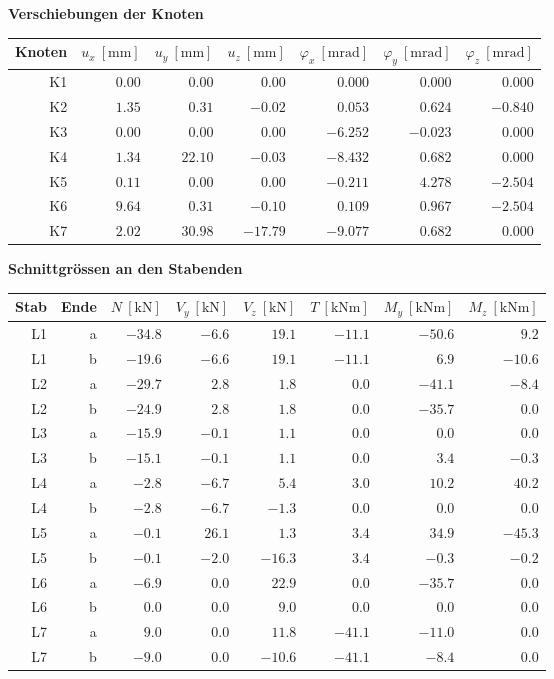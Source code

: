 \documentclass[11pt,a4paper]{article}
\begin{document}
\noindent\textbf{Verschiebungen der Knoten}
\begin{longtable}{rrrrrrr}
\hline
Knoten & $u_x\ [\mathrm{mm}]$ & $u_y\ [\mathrm{mm}]$ & $u_z\ [\mathrm{mm}]$ & $\varphi_x\ [\mathrm{mrad}]$ & $\varphi_y\ [\mathrm{mrad}]$ & $\varphi_z\ [\mathrm{mrad}]$ \\
\hline
\endhead
K1 & $0.00$ & $0.00$ & $0.00$ & $0.000$ & $0.000$ & $0.000$ \\
K2 & $1.35$ & $0.31$ & $-0.02$ & $0.053$ & $0.624$ & $-0.840$ \\
K3 & $0.00$ & $0.00$ & $0.00$ & $-6.252$ & $-0.023$ & $0.000$ \\
K4 & $1.34$ & $22.10$ & $-0.03$ & $-8.432$ & $0.682$ & $0.000$ \\
K5 & $0.11$ & $0.00$ & $0.00$ & $-0.211$ & $4.278$ & $-2.504$ \\
K6 & $9.64$ & $0.31$ & $-0.10$ & $0.109$ & $0.967$ & $-2.504$ \\
K7 & $2.02$ & $30.98$ & $-17.79$ & $-9.077$ & $0.682$ & $0.000$ \\
\hline
\end{longtable}
\noindent\textbf{Schnittgrössen an den Stabenden}
\begin{longtable}{rrrrrrrr}
\hline
Stab & Ende & $N\ [\mathrm{kN}]$ & $V_y\ [\mathrm{kN}]$ & $V_z\ [\mathrm{kN}]$ & $T\ [\mathrm{kNm}]$ & $M_y\ [\mathrm{kNm}]$ & $M_z\ [\mathrm{kNm}]$ \\
\hline
\endhead
L1 & a & $-34.8$ & $-6.6$ & $19.1$ & $-11.1$ & $-50.6$ & $9.2$ \\
L1 & b & $-19.6$ & $-6.6$ & $19.1$ & $-11.1$ & $6.9$ & $-10.6$ \\
L2 & a & $-29.7$ & $2.8$ & $1.8$ & $0.0$ & $-41.1$ & $-8.4$ \\
L2 & b & $-24.9$ & $2.8$ & $1.8$ & $0.0$ & $-35.7$ & $0.0$ \\
L3 & a & $-15.9$ & $-0.1$ & $1.1$ & $0.0$ & $0.0$ & $0.0$ \\
L3 & b & $-15.1$ & $-0.1$ & $1.1$ & $0.0$ & $3.4$ & $-0.3$ \\
L4 & a & $-2.8$ & $-6.7$ & $5.4$ & $3.0$ & $10.2$ & $40.2$ \\
L4 & b & $-2.8$ & $-6.7$ & $-1.3$ & $0.0$ & $0.0$ & $0.0$ \\
L5 & a & $-0.1$ & $26.1$ & $1.3$ & $3.4$ & $34.9$ & $-45.3$ \\
L5 & b & $-0.1$ & $-2.0$ & $-16.3$ & $3.4$ & $-0.3$ & $-0.2$ \\
L6 & a & $-6.9$ & $0.0$ & $22.9$ & $0.0$ & $-35.7$ & $0.0$ \\
L6 & b & $0.0$ & $0.0$ & $9.0$ & $0.0$ & $0.0$ & $0.0$ \\
L7 & a & $9.0$ & $0.0$ & $11.8$ & $-41.1$ & $-11.0$ & $0.0$ \\
L7 & b & $-9.0$ & $0.0$ & $-10.6$ & $-41.1$ & $-8.4$ & $0.0$ \\
\hline
\end{longtable}
\end{document}
